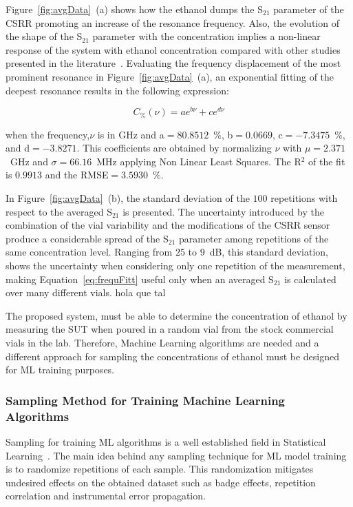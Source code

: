 \documentclass[journal,twoside,web]{ieeecolor}
\begin{document}
Figure~\ref{fig:avgData}~(a) shows how the ethanol dumps the S$_{21}$ parameter of the CSRR promoting an increase of the resonance frequency. Also, the evolution of the shape of the S$_{21}$ parameter with the concentration implies a non-linear response of the system with ethanol concentration compared with other studies presented in the literature~\cite{Abdolrazzaghi2023}. Evaluating the frequency displacement of the most prominent resonance in Figure~\ref{fig:avgData}~(a), an exponential fitting of the deepest resonance results in the following expression:

\begin{equation}
	\label{eq:frequFitt}
	 C_{\%}(\nu) = ae^{b\nu}+ce^{d\nu} 
\end{equation} 

when the frequency,$\nu$ is in GHz and a$=80.8512$~$\%$, b$=0.0669$, c$=-7.3475$~$\%$, and d$=-3.8271$. This coefficients are obtained by normalizing $\nu$ with $\mu=2.371$~GHz and $\sigma=66.16$~MHz applying Non Linear Least Squares. The R$^{2}$ of the fit is $0.9913$ and the RMSE$=3.5930$~$\%$. 
  
In Figure~\ref{fig:avgData}~(b), the standard deviation of the $100$ repetitions with respect to the averaged S$_{21}$ is presented. The uncertainty introduced by the combination of the vial variability and the modifications of the CSRR sensor produce a considerable spread of the S$_{21}$ parameter among repetitions of the same concentration level. Ranging from $25$ to $9$~dB, this standard deviation, shows the uncertainty when considering only one repetition of the measurement, making Equation~\ref{eq:frequFitt} useful only when an averaged S$_{21}$ is calculated over many different vials. hola que tal

The proposed system, must be able to determine the concentration of ethanol by measuring the SUT when poured in a random vial from the stock commercial vials in the lab. Therefore, Machine Learning algorithms are needed and a different approach for sampling the concentrations of ethanol must be designed for ML training purposes.
\\
\subsubsection{Sampling Method for Training Machine Learning Algorithms}
\label{sssec:samplingML}

Sampling for training ML algorithms is a well established field in Statistical Learning~\cite{Wu2020}. The main idea behind any sampling technique for ML model training is to randomize repetitions of each sample. This randomization mitigates undesired effects on the obtained dataset such as badge effects, repetition correlation and instrumental error propagation. 
\end{document}
